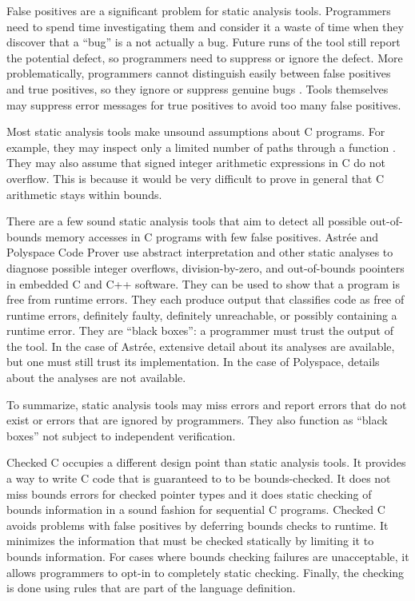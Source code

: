 False positives are a significant problem for static analysis tools. Programmers need
to spend time investigating them and consider it a waste of time when they discover
that a ``bug'' is a not actually a bug.   Future runs of the tool still report
the potential defect, so programmers need to suppress or ignore the defect.
More problematically, programmers cannot distinguish easily between false positives
and true positives, so they  ignore or suppress genuine bugs \cite{Bessey2010}.
Tools themselves may suppress error messages for true positives to avoid
too many false positives.

Most static analysis tools make unsound assumptions about C programs.
For example, they may inspect only a limited number of paths through
a function \cite{Bush2000}.  They may also assume that signed integer arithmetic
expressions in C do not overflow.  This is because it would be very difficult to
prove in general that C arithmetic stays within bounds.

There are a few sound static analysis tools that aim to detect all
possible out-of-bounds memory accesses in C programs with few false positives.
Astr\'{e}e \cite{Astree2016,Blanchet2003,Delmas2007}
and Polyspace Code Prover \cite{Polyspace2016} use 
abstract interpretation and other static analyses to diagnose possible integer
overflows, division-by-zero, and out-of-bounds
poointers in embedded C and C++ software.  They can be used to show that a program is 
free from runtime errors. They each produce output that classifies code as free of
runtime errors, definitely faulty, definitely unreachable, or possibly containing a runtime error.  They are ``black boxes'': a programmer must trust the output of the
tool.  In the case of Astr\'{e}e,  extensive detail about its analyses are available,
but one must still trust its implementation.  In the case of Polyspace, details
about the analyses are not available.

To summarize, static analysis tools may miss errors and report errors that do not exist
or errors that are ignored by programmers.  They also function as ``black
boxes'' not subject to independent verification.

Checked C occupies a different design point than static analysis tools.
It provides a way to write C code that is guaranteed to to be bounds-checked.
It does not miss bounds errors for checked pointer types and it does static 
checking of bounds information in a sound fashion for sequential
C programs.  Checked C avoids problems with false positives
by deferring bounds checks to runtime.  It minimizes the information that
must be checked statically by limiting it to bounds information.
For cases where bounds checking failures are unacceptable, it allows
programmers to opt-in to completely static checking.  Finally, the checking is
done using rules that are part of the language definition.

